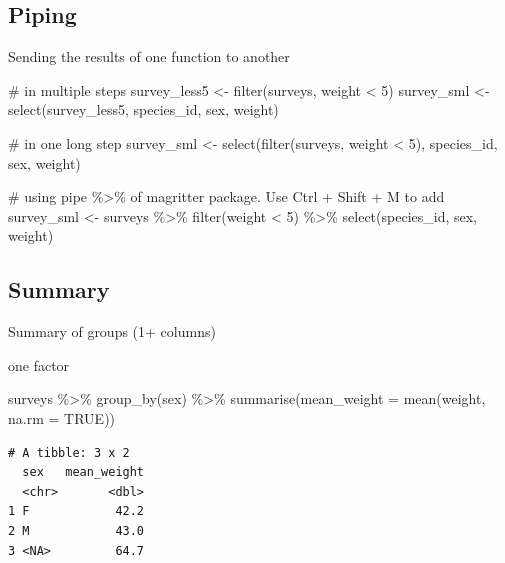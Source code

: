 \documentclass[
  letterpaper,
  DIV=11,
  numbers=noendperiod]{scrreprt}
\newenvironment{Shaded}{\begin{snugshade}}{\end{snugshade}}
\newcommand{\AttributeTok}[1]{\textcolor[rgb]{0.40,0.45,0.13}{#1}}
\newcommand{\CommentTok}[1]{\textcolor[rgb]{0.37,0.37,0.37}{#1}}
\newcommand{\ConstantTok}[1]{\textcolor[rgb]{0.56,0.35,0.01}{#1}}
\newcommand{\DecValTok}[1]{\textcolor[rgb]{0.68,0.00,0.00}{#1}}
\newcommand{\FunctionTok}[1]{\textcolor[rgb]{0.28,0.35,0.67}{#1}}
\newcommand{\NormalTok}[1]{\textcolor[rgb]{0.00,0.23,0.31}{#1}}
\newcommand{\OtherTok}[1]{\textcolor[rgb]{0.00,0.23,0.31}{#1}}
\newcommand{\SpecialCharTok}[1]{\textcolor[rgb]{0.37,0.37,0.37}{#1}}
\begin{document}
\subsection{Piping}\label{piping}

Sending the results of one function to another

\begin{Shaded}
\begin{Highlighting}[]
\CommentTok{\# in multiple steps}
\NormalTok{survey\_less5 }\OtherTok{\textless{}{-}} \FunctionTok{filter}\NormalTok{(surveys, weight }\SpecialCharTok{\textless{}} \DecValTok{5}\NormalTok{)}
\NormalTok{survey\_sml }\OtherTok{\textless{}{-}} \FunctionTok{select}\NormalTok{(survey\_less5, species\_id, sex, weight)}

\CommentTok{\# in one long step}
\NormalTok{survey\_sml }\OtherTok{\textless{}{-}} \FunctionTok{select}\NormalTok{(}\FunctionTok{filter}\NormalTok{(surveys, weight }\SpecialCharTok{\textless{}} \DecValTok{5}\NormalTok{), species\_id, sex, weight)}

\CommentTok{\# using pipe \%\textgreater{}\% of magritter package.  Use Ctrl + Shift + M to add}
\NormalTok{survey\_sml }\OtherTok{\textless{}{-}}\NormalTok{ surveys }\SpecialCharTok{\%\textgreater{}\%}
  \FunctionTok{filter}\NormalTok{(weight }\SpecialCharTok{\textless{}} \DecValTok{5}\NormalTok{) }\SpecialCharTok{\%\textgreater{}\%}
  \FunctionTok{select}\NormalTok{(species\_id, sex, weight)}
\end{Highlighting}
\end{Shaded}

\subsection{Summary}\label{summary}

Summary of groups (1+ columns)

one factor

\begin{Shaded}
\begin{Highlighting}[]
\NormalTok{surveys }\SpecialCharTok{\%\textgreater{}\%}
  \FunctionTok{group\_by}\NormalTok{(sex) }\SpecialCharTok{\%\textgreater{}\%}
  \FunctionTok{summarise}\NormalTok{(}\AttributeTok{mean\_weight =} \FunctionTok{mean}\NormalTok{(weight, }\AttributeTok{na.rm =} \ConstantTok{TRUE}\NormalTok{))}
\end{Highlighting}
\end{Shaded}

\begin{verbatim}
# A tibble: 3 x 2
  sex   mean_weight
  <chr>       <dbl>
1 F            42.2
2 M            43.0
3 <NA>         64.7
\end{verbatim}
\end{document}
